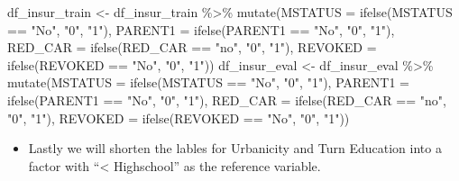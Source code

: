 \documentclass[
]{article}
\newenvironment{Shaded}{\begin{snugshade}}{\end{snugshade}}
\newcommand{\AttributeTok}[1]{\textcolor[rgb]{0.77,0.63,0.00}{#1}}
\newcommand{\FunctionTok}[1]{\textcolor[rgb]{0.00,0.00,0.00}{#1}}
\newcommand{\NormalTok}[1]{#1}
\newcommand{\OtherTok}[1]{\textcolor[rgb]{0.56,0.35,0.01}{#1}}
\newcommand{\SpecialCharTok}[1]{\textcolor[rgb]{0.00,0.00,0.00}{#1}}
\newcommand{\StringTok}[1]{\textcolor[rgb]{0.31,0.60,0.02}{#1}}
\providecommand{\tightlist}{%
  \setlength{\itemsep}{0pt}\setlength{\parskip}{0pt}}
\begin{document}
\begin{Shaded}
\begin{Highlighting}[]
\NormalTok{df\_insur\_train }\OtherTok{\textless{}{-}}\NormalTok{ df\_insur\_train }\SpecialCharTok{\%\textgreater{}\%} 
  \FunctionTok{mutate}\NormalTok{(}\AttributeTok{MSTATUS =} \FunctionTok{ifelse}\NormalTok{(MSTATUS }\SpecialCharTok{==} \StringTok{"No"}\NormalTok{, }\StringTok{"0"}\NormalTok{, }\StringTok{"1"}\NormalTok{),}
         \AttributeTok{PARENT1 =} \FunctionTok{ifelse}\NormalTok{(PARENT1 }\SpecialCharTok{==} \StringTok{"No"}\NormalTok{, }\StringTok{"0"}\NormalTok{, }\StringTok{"1"}\NormalTok{),}
         \AttributeTok{RED\_CAR =} \FunctionTok{ifelse}\NormalTok{(RED\_CAR }\SpecialCharTok{==} \StringTok{"no"}\NormalTok{, }\StringTok{"0"}\NormalTok{, }\StringTok{"1"}\NormalTok{),}
         \AttributeTok{REVOKED =} \FunctionTok{ifelse}\NormalTok{(REVOKED }\SpecialCharTok{==} \StringTok{"No"}\NormalTok{, }\StringTok{"0"}\NormalTok{, }\StringTok{"1"}\NormalTok{))}
\NormalTok{df\_insur\_eval }\OtherTok{\textless{}{-}}\NormalTok{ df\_insur\_eval }\SpecialCharTok{\%\textgreater{}\%} 
  \FunctionTok{mutate}\NormalTok{(}\AttributeTok{MSTATUS =} \FunctionTok{ifelse}\NormalTok{(MSTATUS }\SpecialCharTok{==} \StringTok{"No"}\NormalTok{, }\StringTok{"0"}\NormalTok{, }\StringTok{"1"}\NormalTok{),}
         \AttributeTok{PARENT1 =} \FunctionTok{ifelse}\NormalTok{(PARENT1 }\SpecialCharTok{==} \StringTok{"No"}\NormalTok{, }\StringTok{"0"}\NormalTok{, }\StringTok{"1"}\NormalTok{),}
         \AttributeTok{RED\_CAR =} \FunctionTok{ifelse}\NormalTok{(RED\_CAR }\SpecialCharTok{==} \StringTok{"no"}\NormalTok{, }\StringTok{"0"}\NormalTok{, }\StringTok{"1"}\NormalTok{),}
         \AttributeTok{REVOKED =} \FunctionTok{ifelse}\NormalTok{(REVOKED }\SpecialCharTok{==} \StringTok{"No"}\NormalTok{, }\StringTok{"0"}\NormalTok{, }\StringTok{"1"}\NormalTok{))}
\end{Highlighting}
\end{Shaded}

\begin{itemize}
\tightlist
\item
  Lastly we will shorten the lables for Urbanicity and Turn Education
  into a factor with ``\textless{} Highschool'' as the reference
  variable.
\end{itemize}
\end{document}
